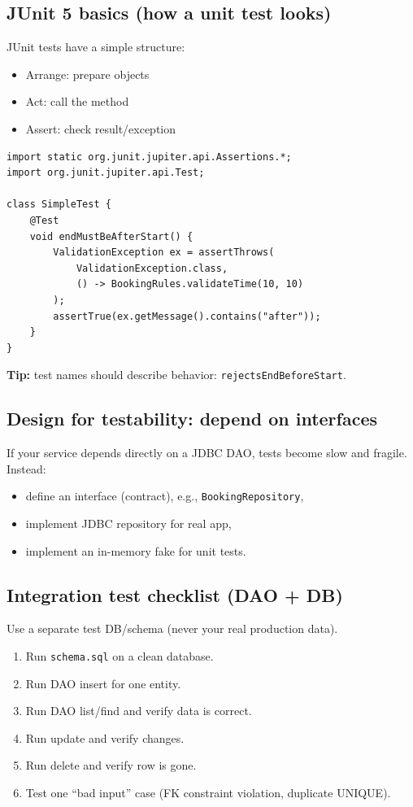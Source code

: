 \documentclass[11pt]{article}
\begin{document}
\subsection{JUnit 5 basics (how a unit test looks)}
JUnit tests have a simple structure:
\begin{itemize}
  \item Arrange: prepare objects
  \item Act: call the method
  \item Assert: check result/exception
\end{itemize}

\begin{lstlisting}
import static org.junit.jupiter.api.Assertions.*;
import org.junit.jupiter.api.Test;

class SimpleTest {
    @Test
    void endMustBeAfterStart() {
        ValidationException ex = assertThrows(
            ValidationException.class,
            () -> BookingRules.validateTime(10, 10)
        );
        assertTrue(ex.getMessage().contains("after"));
    }
}
\end{lstlisting}

\textbf{Tip:} test names should describe behavior: \texttt{rejectsEndBeforeStart}.

\subsection{Design for testability: depend on interfaces}
If your service depends directly on a JDBC DAO, tests become slow and fragile.
Instead:
\begin{itemize}
  \item define an interface (contract), e.g., \texttt{BookingRepository},
  \item implement JDBC repository for real app,
  \item implement an in-memory fake for unit tests.
\end{itemize}

\subsection{Integration test checklist (DAO + DB)}
Use a separate test DB/schema (never your real production data).
\begin{enumerate}
  \item Run \texttt{schema.sql} on a clean database.
  \item Run DAO insert for one entity.
  \item Run DAO list/find and verify data is correct.
  \item Run update and verify changes.
  \item Run delete and verify row is gone.
  \item Test one ``bad input'' case (FK constraint violation, duplicate UNIQUE).
\end{enumerate}
\end{document}

